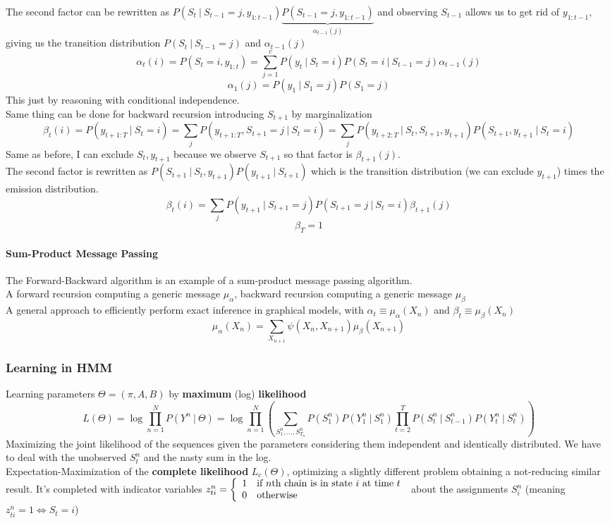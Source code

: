 \documentclass[10pt]{report}
\begin{document}
The second factor can be rewritten as $P(S_t\:|\:S_{t-1}=j,y_{1:t-1}) \underset{\alpha_{t-1}(j)}{\underbrace{P (S_{t-1}=j, y_{1:t-1})}}$ and observing $S_{t-1}$ allows us to get rid of $y_{1:t-1}$, giving us the transition distribution $P(S_t\:|\:S_{t-1}=j)$ and $\alpha_{t-1}(j)$
$$\alpha_t(i) = P(S_t=i,y_{1:t}) = \sum_{j=1}^c P(y_t\:|\:S_t=i) P(S_t=i\:|\:S_{t-1}=j)\alpha_{t-1}(j)$$
$$\alpha_1(j) = P(y_1\:|\:S_1=j)P(S_1=j)$$
This just by reasoning with conditional independence.\\
Same thing can be done for backward recursion introducing $S_{t+1}$ by marginalization $$\beta_t(i) = P(y_{t+1:T}\:|\:S_{t} = i) = \sum_j P(y_{t+1:T},S_{t+1}=j\:|\:S_t=i) = \sum_j P(y_{t+2:T}\:|\:S_t, S_{t+1},y_{t+1})P(S_{t+1},y_{t+1}\:|\:S_t=i)$$
Same as before, I can exclude $S_t, y_{t+1}$ because we observe $S_{t+1}$ so that factor is $\beta_{t+1}(j)$.\\
The second factor is rewritten as $P(S_{t+1}\:|\:S_t,y_{t+1})P(y_{t+1}\:|\:S_{t+1})$ which is the transition distribution (we can exclude $y_{t+1}$) times the emission distribution.
$$\beta_t(i) = \sum_j P(y_{t+1}\:|\:S_{t+1} = j)P(S_{t+1}=j\:|\:S_t=i)\beta_{t+1}(j)$$
$$\beta_T = 1$$
\paragraph{Sum-Product Message Passing} The Forward-Backward algorithm is an example of a sum-product message passing algorithm.\\
A forward recursion computing a generic message $\mu_\alpha$, backward recursion computing a generic message $\mu_\beta$\\
A general approach to efficiently perform exact inference in graphical models, with $\alpha_t \equiv \mu_\alpha(X_n)$ and $\beta_{t}\equiv \mu_\beta(X_n)$
$$\mu_\alpha(X_n) = \sum_{X_{n+1}} \psi(X_n, X_{n+1})\mu_\beta(X_{n+1})$$
\subsubsection{Learning in HMM}
Learning parameters $\Theta=(\pi,A,B)$ by \textbf{maximum} (log) \textbf{likelihood}
$$L(\Theta) = \log\prod_{n=1}^N P(Y^n\:|\:\Theta) = \log\prod_{n=1}^N\left(\sum_{S_1^n,\ldots,S_{T_n}^n} P(S_1^n)P(Y_1^n\:|\:S_1^n)\prod_{t=2}^T P(S_t^n\:|\:S_{t-1}^n)P(Y_t^n\:|\:S_t^n)\right)$$
Maximizing the joint likelihood of the sequences given the parameters considering them independent and identically distributed. We have to deal with the unobserved $S_t^n$ and the nasty sum in the log.\\
Expectation-Maximization of the \textbf{complete likelihood} $L_c(\Theta)$, optimizing a slightly different problem obtaining a not-reducing similar result. It's completed with indicator variables $z_{ti}^n=\left\{\begin{array}{c l}
1&\text{if }n\text{th chain is in state }i\text{ at time }t\\
0&\text{otherwise}
\end{array}\right.$ about the assignments $S_i^n$ (meaning $z_{ti}^n = 1\Leftrightarrow S_t = i$)
\end{document}

